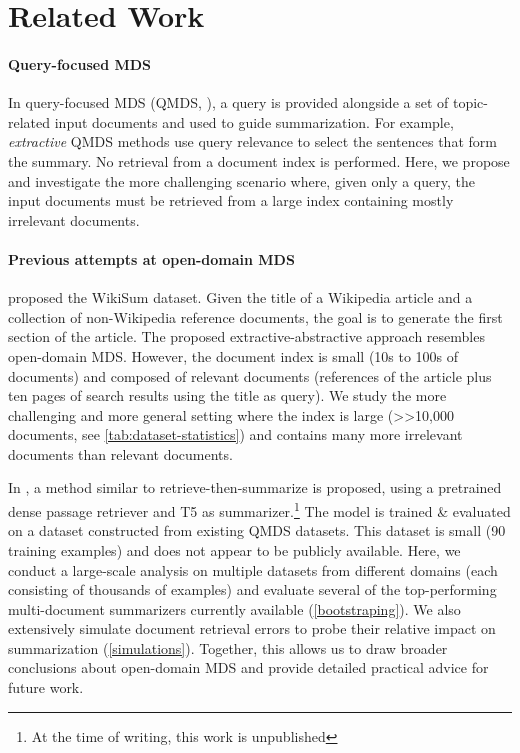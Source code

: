 \documentclass[11pt]{article}
\begin{document}
\vspace{-1.0mm}
\section{Related Work}
\label{related-work}
\vspace{-1.0mm}

\paragraph{Query-focused MDS} In query-focused MDS (QMDS, \citealp{wang-etal-2013-sentence, Feigenblat2017UnsupervisedQM, xu-lapata-2020-coarse, Pasunuru2021DataAF}), a query is provided alongside a set of topic-related input documents and used to guide summarization. For example, \textit{extractive} QMDS methods use query relevance to select the sentences that form the summary. No retrieval from a document index is performed. Here, we propose and investigate the more challenging scenario where, given only a query, the input documents must be retrieved from a large index containing mostly irrelevant documents.

\paragraph{Previous attempts at open-domain MDS} \citet{Liu2018GeneratingWB} proposed the WikiSum dataset. Given the title of a Wikipedia article and a collection of non-Wikipedia reference documents, the goal is to generate the first section of the article. The proposed extractive-abstractive approach resembles open-domain MDS. However, the document index is small (10s to 100s of documents) and composed of relevant documents (references of the article plus ten pages of search results using the title as query). We study the more challenging and more general setting where the index is large (>>10,000 documents, see \autoref{tab:dataset-statistics}) and contains many more irrelevant documents than relevant documents.

In \citet{DBLP:journals/corr/abs-2112-07536}, a method similar to retrieve-then-summarize is proposed, using a pretrained dense passage retriever \citep{karpukhin-etal-2020-dense} and T5 \citep{JMLR:v21:20-074} as summarizer.\footnote{At the time of writing, this work is unpublished} The model is trained \& evaluated on a dataset constructed from existing QMDS datasets. This dataset is small (90 training examples) and does not appear to be publicly available. Here, we conduct a large-scale analysis on multiple datasets from different domains (each consisting of thousands of examples) and evaluate several of the top-performing multi-document summarizers currently available (\textsection \ref{bootstraping}). We also extensively simulate document retrieval errors to probe their relative impact on summarization (\textsection \ref{simulations}). Together, this allows us to draw broader conclusions about open-domain MDS and provide detailed practical advice for future work.
\end{document}

